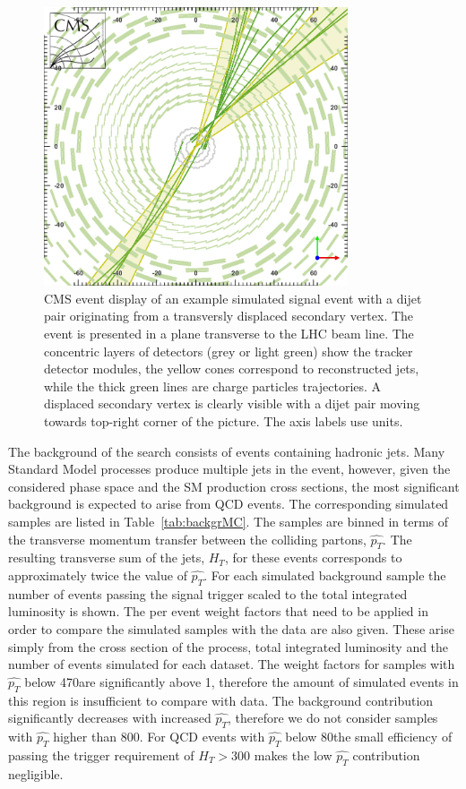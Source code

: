 \begin{figure}[htbp]
\centering
 \includegraphics[width=0.8\textwidth]{plots/eventDisplay.png}
\caption{CMS event display of an example simulated signal event with a dijet pair originating from a transversly displaced secondary vertex.
The event is presented in a plane transverse to the LHC beam line.
The concentric layers of detectors (grey or light green) show the tracker detector modules, the
yellow cones correspond to reconstructed jets, while the thick green lines are charge particles
trajectories. A displaced secondary vertex is clearly visible with a dijet pair moving towards
top-right corner of the picture.
The axis labels use \cm units. \label{fig:eventDisplay}}
\end{figure}


The background of the search consists of events containing hadronic jets. Many Standard Model processes
produce multiple jets in the event, however, given the considered phase space and the SM production
cross sections,
 the most significant background 
is expected to arise from QCD events. The corresponding simulated samples
are listed in Table~\ref{tab:backgrMC}. The samples are binned in terms
of the transverse momentum transfer between the colliding partons, $\hat{p_T}$.
The resulting transverse sum
of the jets, $H_T$, for these events corresponds to approximately twice the value of $\hat{p_T}$. 
For each simulated background sample the number of events passing the signal trigger
scaled to the total integrated luminosity is shown. The per event weight factors that need 
to be applied in order to compare the simulated samples with the data are also given. These
arise simply from the cross section of the process, total integrated luminosity and the number
of events simulated for each dataset.
The weight factors for samples with $\hat{p_T}$
below 470\GeV are significantly above 1, therefore the amount of simulated events in this region is insufficient to compare with data.
The background contribution
significantly decreases with increased $\hat{p_T}$, therefore we do not consider samples with $\hat{p_T}$ higher
than 800\GeV. For QCD events with $\hat{p_T}$ below 80\GeV the small efficiency of passing the trigger
 requirement of $H_T>$300\GeV
makes the low $\hat{p_T}$ contribution negligible.

